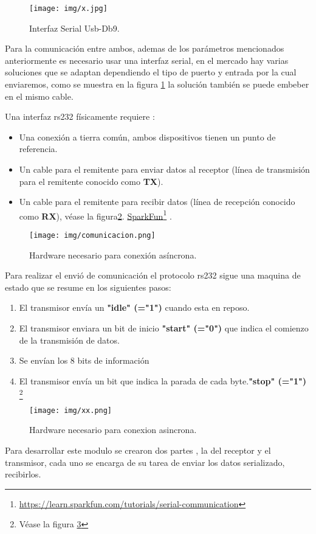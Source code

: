 \documentclass[a4paper]{article}
\newcommand\fnurl[2]{%
\href{#2}{#1}\footnote{\url{#2}}%
}
\begin{document}
\begin{figure}[H]
  \centering
     \texttt{[image: img/x.jpg]}
  \caption{Interfaz Serial Usb-Db9.}
    \label{fig:rsserial}
\end{figure}

Para la comunicación entre ambos, ademas de los parámetros mencionados anteriormente es necesario usar una interfaz serial, en el mercado hay varias soluciones que se adaptan dependiendo el tipo de puerto y entrada por la cual enviaremos, como se muestra en la figura \ref{fig:rsserial}  la solución también se puede embeber en el mismo cable.

Una interfaz rs232 físicamente requiere :
\begin{itemize}
\item Una conexión a tierra común, ambos dispositivos tienen un punto de referencia.
\item Un cable para el remitente para enviar datos al receptor (línea de transmisión para el remitente conocido como \textbf{TX}).
\item Un cable para el remitente para recibir datos  (línea de recepción conocido como \textbf{RX}), véase la figura\ref{fig:hard}. \fnurl{SparkFun}{https://learn.sparkfun.com/tutorials/serial-communication}.
\end{itemize}
\begin{figure}[H]
  \centering
     \texttt{[image: img/comunicacion.png]}
  \caption{Hardware necesario para conexión asíncrona.}
    \label{fig:hard}
\end{figure}

Para realizar el envió de comunicación el protocolo rs232 sigue una maquina de estado que se resume en los siguientes pasos:
\begin{enumerate}
\item El transmisor envía un \textbf{"idle" (="1")}  cuando esta en reposo.
\item El transmisor enviara un bit de inicio \textbf{"start" (="0")} que indica el comienzo de la transmisión de datos.
\item Se envían los 8 bits de información
\item El transmisor envía un bit que indica la parada de cada byte.\textbf{"stop" (="1")} \footnote{Véase la figura \ref{fig:senal}}
\end{enumerate}

\begin{figure}[H]
  \centering
     \texttt{[image: img/xx.png]}
  \caption{Hardware necesario para conexion asincrona.}
    \label{fig:senal}
\end{figure}
Para desarrollar este modulo se crearon dos partes , la del receptor y el transmisor, cada uno se encarga de su tarea de enviar los datos serializado, recibirlos. 
\end{document}
